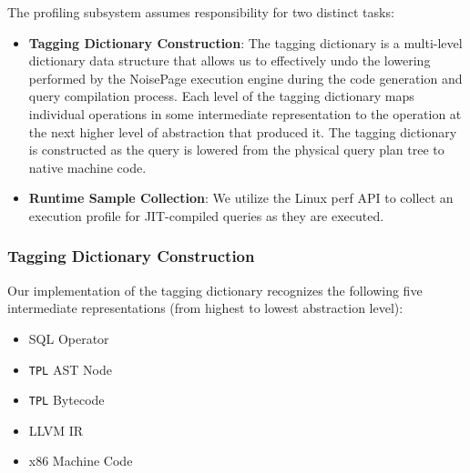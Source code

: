 \documentclass{vldb}
\newcommand{\tpl}{\texttt{TPL}\xspace}
\begin{document}
The profiling subsystem assumes responsibility for two distinct tasks:

\begin{itemize}
    \item \textbf{Tagging Dictionary Construction}: The tagging dictionary is a multi-level dictionary data structure that allows us to effectively undo the lowering performed by the NoisePage execution engine during the code generation and query compilation process. Each level of the tagging dictionary maps individual operations in some intermediate representation to the operation at the next higher level of abstraction that produced it. The tagging dictionary is constructed as the query is lowered from the physical query plan tree to native machine code.
    \item \textbf{Runtime Sample Collection}: We utilize the Linux perf API \cite{perf} to collect an execution profile for JIT-compiled queries as they are executed. 
\end{itemize}

\subsubsection{Tagging Dictionary Construction}

Our implementation of the tagging dictionary recognizes the following five intermediate representations (from highest to lowest abstraction level):
\begin{itemize}
    \item SQL Operator
    \item \tpl AST Node
    \item \tpl Bytecode
    \item LLVM IR
    \item x86 Machine Code
\end{itemize}
\end{document}
